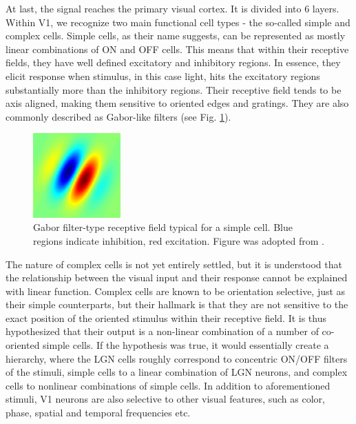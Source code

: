 At last, the signal reaches the primary visual cortex. It is divided into 6 layers. Within V1, we recognize two main functional cell types - the so-called simple and complex cells. Simple cells, as their name suggests, can be represented as mostly linear combinations of ON and OFF cells. This means that within their receptive fields, they have well defined excitatory and inhibitory regions. In essence, they elicit response when stimulus, in this case light, hits the excitatory regions substantially more than the inhibitory regions. Their receptive field tends to be axis aligned, making them sensitive to oriented edges and gratings. They are also commonly described as Gabor-like filters (see Fig. \ref{fig:1.2}). 

\begin{figure}[ht]
    \centering
    \includegraphics[width=0.3\textwidth]{../figures/01_Gabor_filter}
    \caption[Gabor filter-type receptive field typical for a simple cell]{Gabor filter-type receptive field typical for a simple cell. Blue regions indicate inhibition, red excitation. Figure was adopted from \cite{pict_gabor_filter}.}
    \label{fig:1.2}
\end{figure}

The nature of complex cells is not yet entirely settled, but it is understood that the relationship between the visual input and their response cannot be explained with linear function. Complex cells are known to be orientation selective, just as their simple counterparts, but their hallmark is that they are not sensitive to the exact position of the oriented stimulus within their receptive field. It is thus hypothesized that their output is a non-linear combination of a number of co-oriented simple cells. If the hypothesis was true, it would essentially create a hierarchy, where the LGN cells roughly correspond to concentric ON/OFF filters of the stimuli, simple cells to a linear combination of LGN neurons, and complex cells to nonlinear combinations of simple cells. In addition to aforementioned stimuli, V1 neurons are also selective to other visual features, such as color, phase, spatial and temporal frequencies etc.

